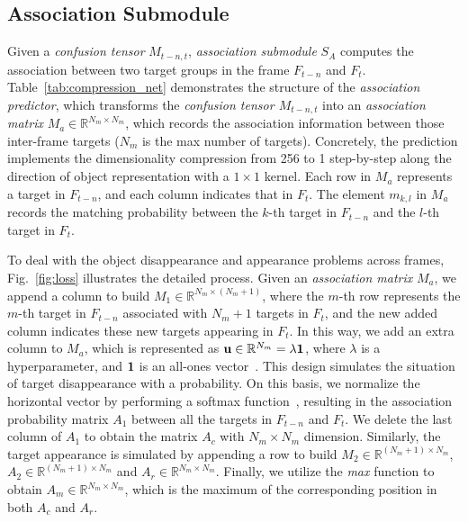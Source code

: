 \documentclass[acmsmall]{acmart}
\begin{document}


\subsection{Association Submodule} \label{sec:association_submodule}
\label{sec:association_submodule}
{Given a \emph{confusion tensor} $M_{t-n,t}$,} \emph{association submodule} $S_A$ computes the association between two target groups in the frame $F_{t-n}$ and $F_t$.
{
Table~\ref{tab:compression_net} demonstrates the structure of the \emph{association predictor},
which transforms the \emph{confusion tensor $M_{t-n,t}$} into an \emph{association matrix} $M_a \in \mathbb R^{N_m \times N_m}$, which records the association information between those inter-frame targets ($N_m$ is the max number of targets).
Concretely, the prediction implements the dimensionality compression from 256 to 1 step-by-step along the direction of object representation with a $1 \times 1$ kernel.
Each row in $M_a$ represents a target in $F_{t-n}$, and each column indicates that in $F_{t}$.
The element $m_{k,l}$ in $M_a$ records the matching probability between the $k$-th target in $F_{t-n}$ and the $l$-th target in $F_t$. 
}

{
To deal with the object disappearance and appearance problems across frames, Fig.~\ref{fig:loss} illustrates the detailed process. 
Given an \emph{association matrix} $M_a$, we append a column to build $M_1 \in \mathbb R^{N_m \times (N_m + 1)}$, where the $m$-th row represents the $m$-th target in $F_{t-n}$ associated with $N_m+1$ targets in $F_t$,
and the new added column indicates these new targets appearing in $F_t$. 
In this way, we add an extra column to $M_a$, which is represented as ${\bf u} \in \mathbb R^{N_m} = \lambda {\bf 1} $, where $\lambda$ is a hyperparameter, and ${\bf 1}$ is an all-ones vector~\cite{dan}.
This design simulates the situation of target disappearance with a probability.
On this basis, we normalize the horizontal vector by performing a softmax function~\cite{train_mot}, resulting in the association probability matrix $A_1$ between all the targets in $F_{t-n}$ and $F_t$.
We delete the last column of $A_1$ to obtain the matrix $A_c$ with $N_m \times N_m$ dimension.
Similarly, the target appearance is simulated by appending a row to build $ M_2 \in \mathbb R^{ (N_m + 1) \times N_m}$, $A_2 \in \mathbb R^{(N_m +1) \times N_m}$ and $A_r \in \mathbb R^{N_m \times N_m}$.
Finally, we utilize the \textit{max} function to obtain $A_m \in \mathbb R^{N_m \times N_m}$, which is the maximum of the corresponding position in both $A_c$ and $A_r$.
}
\end{document}

